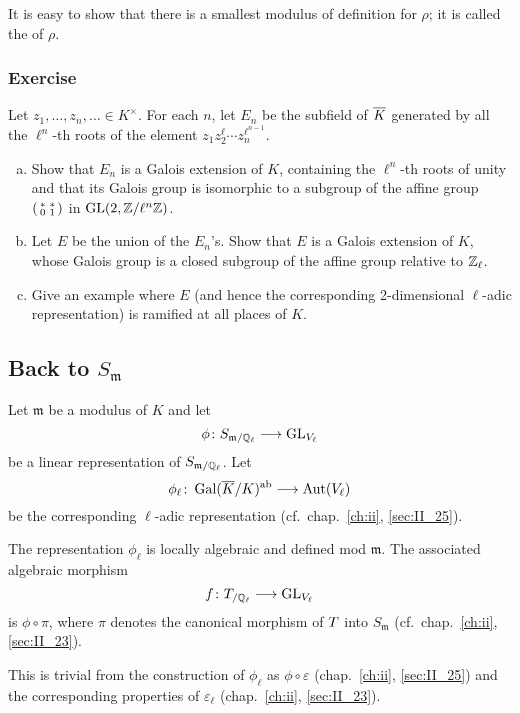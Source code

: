 \begin{obs}
It is easy to show that there is a smallest modulus of definition for $\rho$;
it is called the  of $\rho$.
\end{obs}

\subsubsection*{Exercise}
Let $z_1, \dots, z_n, \dots \in K^\times$. For each $n$, let $E_n$ be the
\dpage
subfield of $\overline{K}$ generated by all the $\ell^n$-th roots of the element
$z_1 z_2^\ell \cdots z_n^{\ell^{n-1}}$.
\begin{enumerate}[a)]
\item Show that $E_n$ is a Galois extension of $K$, containing the $\ell^n$-th
	roots of unity and that its Galois group is isomorphic to a subgroup of
	the affine group $
	\begin{psmallmatrix}
		* & * \\
		0 & 1
	\end{psmallmatrix} 
	$ in $\operatorname{GL}(2, \mathbb{Z}/\ell^n\mathbb{Z})$.
\item Let $E$ be the union of the $E_n$'s. Show that $E$ is a Galois extension
	of $K$, whose Galois group is a closed subgroup of the affine group
	relative to $\mathbb{Z}_\ell$.
\item Give an example where $E$ (and hence the corresponding 2-dimensional
	$\ell$-adic representation) is ramified at all places of $K$.
\end{enumerate}

\subsection{Back to \texorpdfstring{$S_{\mathfrak{m}}$}{Sm}}
\label{sec:III_23}
Let $\mathfrak{m}$ be a modulus of $K$ and let
\[
	\phi \colon S_{\mathfrak{m}/\mathbb{Q}_\ell} \longrightarrow \operatorname{GL}_{V_\ell}
\]
be a linear representation of $S_{\mathfrak{m}/\mathbb{Q}_\ell}$. Let
\[
	\phi_\ell \colon \operatorname{Gal}(\overline{K}/K)^{\mathrm{ab}} \longrightarrow \operatorname{Aut}(V_\ell)
\]
be the corresponding $\ell$-adic representation (cf.\ chap.~\ref{ch:ii},
\ref{sec:II_25}).

\begin{thm}\label{thm:III_23_1}
	The representation $\phi_\ell$ is locally algebraic and defined mod
	$\mathfrak{m}$. The associated algebraic morphism
	\dpage
	\[
		f \colon T_{/\mathbb{Q}_\ell} \longrightarrow \operatorname{GL}_{V_\ell}
	\]
	is $\phi \circ \pi$, where $\pi$ denotes the canonical morphism of
	$T$ into $S_{\mathfrak{m}}$ (cf.\ chap.~\ref{ch:ii},
	\ref{sec:II_23}).\label{errata:refIII23}
\end{thm}
This is trivial from the construction of $\phi_\ell$ as $\phi \circ
\varepsilon$ (chap.~\ref{ch:ii}, \ref{sec:II_25}) and the corresponding
properties of $\varepsilon_\ell$ (chap.~\ref{ch:ii}, \ref{sec:II_23}).

